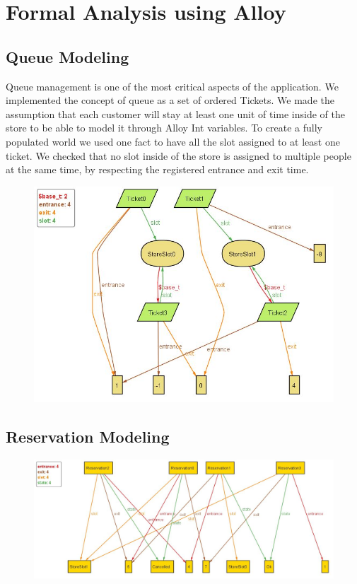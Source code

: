 \section{Formal Analysis using Alloy}

\subsection{Queue Modeling}
Queue management is one of the most critical aspects of the application.
We implemented the concept of queue as a set of ordered Tickets.
We made the assumption that each customer will stay at least one unit of time inside of the store to be able to model it through Alloy Int variables. 
To create a fully populated world we used one fact to have all the slot assigned to at least one ticket. 
We checked that no slot inside of the store is assigned to multiple people at the same time, by respecting the registered entrance and exit time. 


\begin{figure}[H]
    \centering
    \includegraphics[width=1\textwidth]{alloy/Line_Alloy.JPG}
\end{figure}

\subsection{Reservation Modeling}

\begin{figure}[H]
    \centering
    \includegraphics[width=1\textwidth]{alloy/Reservation_Alloy.JPG}
\end{figure}

